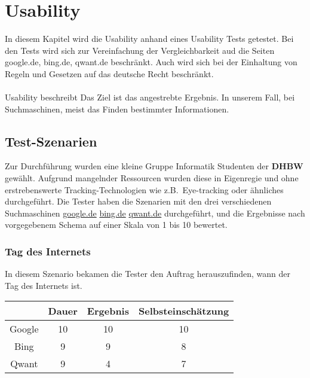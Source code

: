 \section{Usability}\label{sec:usability}

In diesem Kapitel wird die Usability anhand eines Usability Tests getestet.
Bei den Tests wird sich zur Vereinfachung der Vergleichbarkeit aud die Seiten google.de, bing.de, qwant.de beschränkt.
Auch wird sich bei der Einhaltung von Regeln und Gesetzen auf das deutsche Recht beschränkt.\\\\
Usability beschreibt
\autocite[14]{9783960886297}
Das Ziel ist das angestrebte Ergebnis.
In unserem Fall, bei Suchmaschinen, meist das Finden bestimmter Informationen.

\subsection{Test-Szenarien}\label{subsec:szenarien}
Zur Durchführung wurden eine kleine Gruppe Informatik Studenten der \textbf{DHBW} gewählt.
Aufgrund mangelnder Ressourcen wurden diese in Eigenregie und ohne erstrebenswerte Tracking-Technologien wie z.B.\ Eye-tracking oder ähnliches durchgeführt.
Die Tester haben die Szenarien mit den drei verschiedenen Suchmaschinen \url{google.de} \url{bing.de} \url{qwant.de} durchgeführt,
und die Ergebnisse nach vorgegebenem Schema auf einer Skala von 1 bis 10 bewertet.

\subsubsection{Tag des Internets}\label{subsubsec:szenario1}
In diesem Szenario bekamen die Tester den Auftrag herauszufinden, wann der Tag des Internets ist.

\begin{tabular}{|c|c|c|c|}
    \hline
    & Dauer & Ergebnis & Selbsteinschätzung \\
    \hline
    Google & 10    & 10       & 10                 \\
    \hline
    Bing   & 9     & 9        & 8                  \\
    \hline
    Qwant  & 9     & 4        & 7                  \\
    \hline
\end{tabular}

